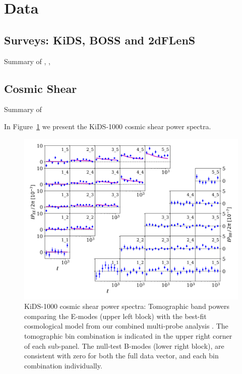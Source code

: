 \section{Data}
\label{sec:data}

\subsection{Surveys:  KiDS, BOSS and 2dFLenS}
\label{sec:surveys}
Summary of \citet{kuijken/etal:2019},  \citet{blake/etal:2016}, \citet{alam/etal:2015}

\subsection{Cosmic Shear}
\label{sec:cosmic_shear}
Summary of \citet{asgari/etal:inprep}

In Figure~\ref{fig:Pkk} we present the KiDS-1000 cosmic shear power spectra.

\begin{figure}
        \includegraphics[width=\textwidth]{Data_Plots/Pkk/Pkk_K1000_2Dbins_v2_goldclasses_Flag_SOM_Fid.png}
        \caption{KiDS-1000 cosmic shear power spectra:  Tomographic
          band powers comparing the E-modes (upper left block) with the best-fit
          cosmological model from our combined multi-probe analysis
          .  The tomographic
        bin combination is indicated in the upper right corner of each
      sub-panel.  The null-test B-modes (lower right block), are
      consistent with zero for both the full data vector, and each
     bin combination individually.}
        \label{fig:Pkk}
\end{figure}


